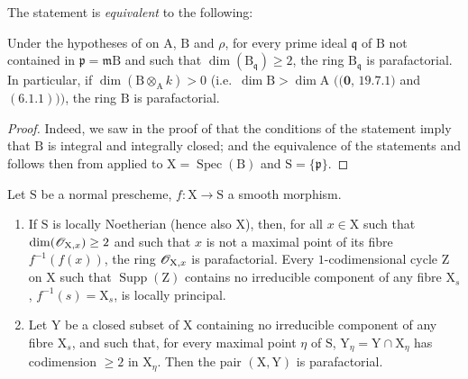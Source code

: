 The statement  is \emph{equivalent} to the following:

\begin{corollary}[21.14.2]
\label{IV.21.14.2}
Under the hypotheses of  on $\mathrm{A}$, $\mathrm{B}$ and $\rho$, for every prime ideal $\mathfrak{q}$ of $\mathrm{B}$ not contained in $\mathfrak{p}=\mathfrak{m}\mathrm{B}$ and such that $\dim(\mathrm{B}_{\mathfrak{q}})\geq 2$, the ring $\mathrm{B}_{\mathfrak{q}}$ is parafactorial.
In particular, if $\dim(\mathrm{B}\otimes_{\mathrm{A}}k)>0$ \textup{(}i.e.\ $\dim\mathrm{B}>\dim\mathrm{A}$ $((\mathbf{0}$, $19.7.1)$ and $(6.1.1)))$, the ring $\mathrm{B}$ is parafactorial.
\end{corollary}

\begin{proof}
Indeed, we saw in the proof of  that the conditions of the statement imply that $\mathrm{B}$ is integral and integrally closed; and the equivalence of the statements  and  follows then from  applied to $\mathrm{X}=\operatorname{Spec}(\mathrm{B})$ and $\mathrm{S}=\{\mathfrak{p}\}$.
\end{proof}

\begin{proposition}[21.14.3]
\label{IV.21.14.3}
Let $\mathrm{S}$ be a normal prescheme, $f:\mathrm{X}\to\mathrm{S}$ a smooth morphism.
\begin{enumerate}[label=\textup{(\roman*)}]
  \item If $\mathrm{S}$ is locally Noetherian \textup{(}hence also $\mathrm{X}$\textup{)}, then, for all $x\in\mathrm{X}$ such that $\dim(\mathscr{O}_{\mathrm{X},x})\geq 2$ and such that $x$ is not a maximal point of its fibre $f^{-1}(f(x))$, the ring $\mathscr{O}_{\mathrm{X},x}$ is parafactorial.
  Every $1$-codimensional cycle $\mathrm{Z}$ on $\mathrm{X}$ such that $\operatorname{Supp}(\mathrm{Z})$ contains no irreducible component of any fibre $\mathrm{X}_s$, $f^{-1}(s)=\mathrm{X}_s$, is locally principal.
  \item Let $\mathrm{Y}$ be a closed subset of $\mathrm{X}$ containing no irreducible component of any fibre $\mathrm{X}_s$, and such that, for every maximal point $\eta$ of $\mathrm{S}$, $\mathrm{Y}_\eta=\mathrm{Y}\cap\mathrm{X}_\eta$ has codimension $\geq 2$ in $\mathrm{X}_\eta$.
  Then the pair $(\mathrm{X},\mathrm{Y})$ is parafactorial.
\end{enumerate}
\end{proposition}

